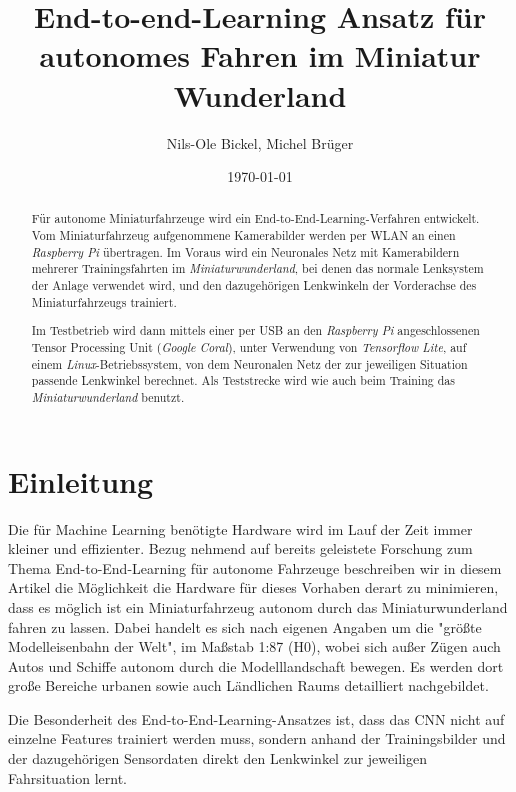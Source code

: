 \documentclass[a4paper, 12pt]{scrartcl}
\title{End-to-end-Learning Ansatz für autonomes Fahren im Miniatur Wunderland}
\author{Nils-Ole Bickel, Michel Brüger}
\date{\today}
\begin{document}
	
\maketitle



\begin{abstract}	
Für autonome Miniaturfahrzeuge wird ein End-to-End-Learning-Verfahren entwickelt. Vom Miniaturfahrzeug aufgenommene Kamerabilder werden per WLAN an einen \emph{Raspberry Pi} übertragen. Im Voraus wird ein Neuronales Netz mit Kamerabildern mehrerer Trainingsfahrten im \emph{Miniaturwunderland}, bei denen das normale Lenksystem der Anlage verwendet wird, und den dazugehörigen Lenkwinkeln der Vorderachse des Miniaturfahrzeugs trainiert. 

Im Testbetrieb wird dann mittels einer per USB an den \emph{Raspberry Pi} angeschlossenen Tensor Processing Unit (\emph{Google Coral}), unter Verwendung von \emph{Tensorflow Lite}, auf einem \emph{Linux}-Betriebssystem, von dem Neuronalen Netz der zur jeweiligen Situation passende Lenkwinkel berechnet.
Als Teststrecke wird wie auch beim Training das \emph{Miniaturwunderland} benutzt.
\end{abstract}
	


\newpage
	
	\section{Einleitung}
	Die für Machine Learning benötigte Hardware wird im Lauf der Zeit immer kleiner und effizienter. Bezug nehmend auf bereits geleistete Forschung zum Thema End-to-End-Learning für autonome Fahrzeuge \cite{article} beschreiben wir in diesem Artikel die Möglichkeit die Hardware für dieses Vorhaben derart zu minimieren, dass es möglich ist ein Miniaturfahrzeug \cite{article2} autonom durch das Miniaturwunderland fahren zu lassen. Dabei handelt es sich nach eigenen Angaben um die "größte Modelleisenbahn der Welt", im Maßstab 1:87 (H0), wobei sich außer Zügen auch Autos und Schiffe autonom durch die Modelllandschaft bewegen. Es werden dort große Bereiche urbanen sowie auch Ländlichen Raums detailliert nachgebildet.
	
	 Die Besonderheit des End-to-End-Learning-Ansatzes ist, dass das CNN nicht auf einzelne Features trainiert werden muss, sondern anhand der Trainingsbilder und der dazugehörigen Sensordaten direkt den Lenkwinkel zur jeweiligen Fahrsituation lernt. 
\end{document}
